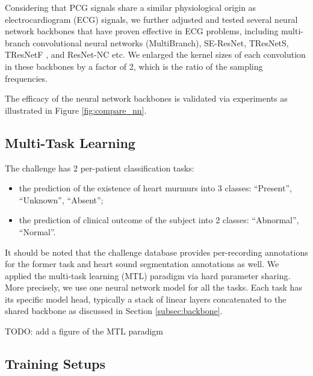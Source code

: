 
% 

Considering that PCG signals share a similar physiological origin as electrocardiogram (ECG) signals, we further adjusted and tested several neural network backbones that have proven effective in ECG problems, including multi-branch convolutional neural networks (MultiBranch), SE-ResNet, TResNetS, TResNetF \cite{Kang_2022_cinc2021_iop}, and ResNet-NC \cite{ribeiro2020automatic} etc. We enlarged the kernel sizes of each convolution in these backbones by a factor of 2, which is the ratio of the sampling frequencies.

The efficacy of the neural network backbones is validated via experiments as illustrated in Figure \ref{fig:compare_nn}.



\subsection{Multi-Task Learning}
\label{subsec:mtl}



The challenge \cite{cinc2022} has 2 per-patient classification tasks:
\begin{itemize}
    \item the prediction of the existence of heart murmurs into 3 classes: ``Present'', ``Unknown'', ``Absent'';
    \item the prediction of clinical outcome of the subject into 2 classes: ``Abnormal'', ``Normal''.
\end{itemize}

It should be noted that the challenge database \cite{Oliveira_2021_CirCor} provides per-recording annotations for the former task and heart sound segmentation annotations as well. We applied the multi-task learning (MTL) paradigm \cite{Caruana_1997_mtl} via hard parameter sharing. More precisely, we use one neural network model for all the tasks. Each task has its specific model head, typically a stack of linear layers concatenated to the shared backbone as discussed in Section \ref{subsec:backbone}.

TODO: add a figure of the MTL paradigm

\subsection{Training Setups}
\label{subsec:training}

